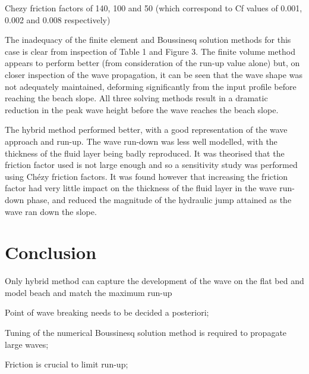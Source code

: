 Chezy friction factors of 140, 100 and 50 (which correspond to Cf values of
0.001, 0.002 and 0.008 respectively)

The inadequacy of the finite element and Boussinesq solution methods for this
case is clear from inspection of Table 1 and Figure 3.  The finite volume
method appears to perform better (from consideration of the run-up value alone)
but, on closer inspection of the wave propagation, it can be seen that the wave
shape was not adequately maintained, deforming significantly from the input
profile before reaching the beach slope. All three solving methods result in a
dramatic reduction in the peak wave height before the wave reaches the beach
slope.

The hybrid method performed better, with a good representation of the wave
approach and run-up.  The wave run-down was less well modelled, with the
thickness of the fluid layer being badly reproduced. It was theorised that the
friction factor used is not large enough and so a sensitivity study was
performed using Chézy friction factors. It was found however that increasing
the friction factor had very little impact on the thickness of the fluid layer
in the wave run-down phase, and reduced the magnitude of the hydraulic jump
attained as the wave ran down the slope.

\section{Conclusion}

Only hybrid method can capture the development of the wave on the flat bed and
model beach and match the maximum run-up

Point of wave breaking needs to be decided a posteriori;

Tuning of the numerical Boussinesq solution method is required to propagate large waves;

Friction is crucial to limit run-up;
